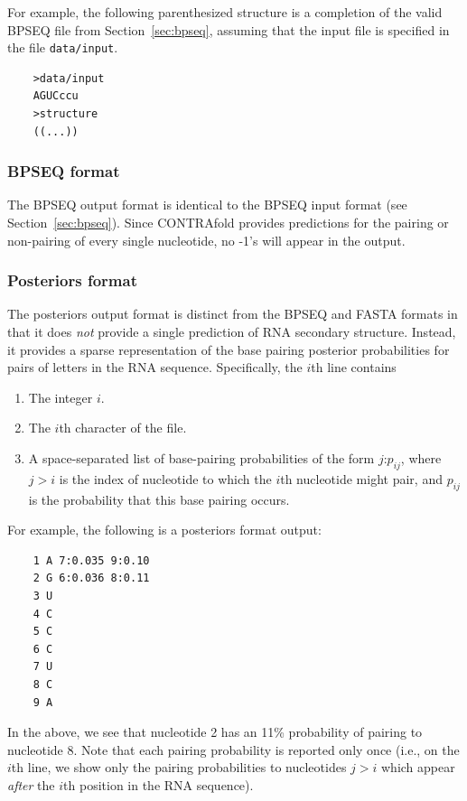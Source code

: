 \documentclass{article}
\begin{document}
  For example, the following parenthesized structure is a completion of the
  valid BPSEQ file from Section~\ref{sec:bpseq}, assuming that the input file
  is specified in the file \texttt{data/input}.
  \begin{verbatim}
    >data/input
    AGUCccu
    >structure
    ((...))\end{verbatim}

  \subsubsection{BPSEQ format}
  
  The BPSEQ output format is identical to the BPSEQ input format (see
  Section~\ref{sec:bpseq}).  Since CONTRAfold provides predictions for
  the pairing or non-pairing of every single nucleotide, no -1's will
  appear in the output.
  
  \subsubsection{Posteriors format}
  \label{sec:posteriors}
  
  The posteriors output format is distinct from the BPSEQ and FASTA
  formats in that it does \emph{not} provide a single prediction of RNA
  secondary structure.  Instead, it provides a sparse representation of the
  base pairing posterior probabilities for pairs of letters in the RNA
  sequence.  Specifically, the $i$th line contains
  \begin{enumerate}
  \item The integer $i$.
  \item The $i$th character of the file.
  \item A space-separated list of base-pairing probabilities of the form
    $j$:$p_{ij}$, where $j>i$ is the index of  nucleotide to which the $i$th
    nucleotide might pair, and $p_{ij}$ is the probability that this
    base pairing occurs.
  \end{enumerate}
  For example, the following is a posteriors format output:
  \begin{verbatim}
    1 A 7:0.035 9:0.10
    2 G 6:0.036 8:0.11
    3 U
    4 C
    5 C
    6 C
    7 U
    8 C
    9 A\end{verbatim}
  In the above, we see that nucleotide 2 has an 11\% probability of pairing
  to nucleotide 8.  Note that each pairing probability is reported only once
  (i.e., on the $i$th line, we show only the pairing probabilities to nucleotides
  $j > i$ which appear \emph{after} the $i$th position in the RNA sequence).
\end{document}
